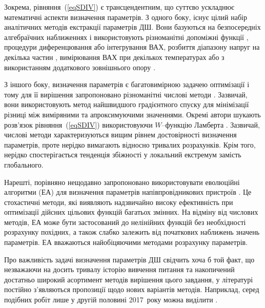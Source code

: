 Зокрема, рівняння~(\ref{eqSDIV}) є трансцендентним, що суттєво ускладнює математичні аспекти визначення параметрів.
З одного боку, існує цілий набір аналітичних методів екстракції параметрів ДШ.
Вони базуються на безпосередніх алгебраїчних наближеннях і використовують різноманітні допоміжні функції \cite{Norde,Lien,Werner,Cheung,Gromov,Lee,Bohlin,Cibils,Manifacier},
процедури  диференцювання  \cite{Mikhelashvili} або інтегрування  \cite{Kaminski,Ortiz1995,Durmus} ВАХ,
розбиття діапазону напруг на декілька частин \cite{Cataldo},
вимірювання ВАХ при декількох температурах \cite{Sato} або з використанням додаткового зовнішнього опору \cite{Lyakas}.


З іншого боку, визначення параметрів є багатовимірною задачею оптимізації і тому для її вирішення запропоновано різноманітні числові методи \cite{Ortiz1999,Evangelou,Donoval,Ferhat}.
Зазвичай, вони використовують метод найшвидшого градієнтного спуску для мінімізації різниці між виміряними та апроксимуючими значеннями.
Окремі автори\cite{Lambert_Jung,Ortiz2005} шукають розв'язок рівняння~(\ref{eqSDIV}) використовуючи $W$--функцію Ламберта
\cite{LambertBook}.
Зазвичай, числові методи характеризуються вищим рівнем достовірності визначення параметрів, проте нерідко вимагають відносно тривалих розрахунків.
Крім того, нерідко спостерігається тенденція збіжності у локальний екстремум замість глобального.

Нарешті, порівняно нещодавно запропоновано використовувати еволюційні алгоритми (ЕА) для визначення параметрів напівпровідникових пристроїв \cite{PSO_Ye,DEWang,GA_Li,P-DE_Ishaque,TLBO_Patel,MABC,PSOWang,GA_Schottky}.
Це стохастичні методи, які виявляють надзвичайно високу ефективність при оптимізації дійсних цільових функцій багатьох змінних.
На відміну від числових методів, ЕА може бути застосований до нелінійних функцій без необхідності розрахунку похідних, а також слабко залежить від початкових наближень значень параметрів.
ЕА вважаються \cite{P-DE_Ishaque} найобіцяючими  методами розрахунку параметрів.

Про важливість задачі визначення параметрів ДШ свідчить хоча б той факт, що
незважаючи на досить тривалу історію вивчення питання та накопичений достатньо широкий асортимент методів вирішення цього завдання,
у літературі постійно з'являються пропозиції щодо нових варіантів методів.
Наприклад, серед подібних робіт лише у другій половині 2017~року можна виділити \cite{Noise:Roy,MikhelashviliJAP2017,Cataldo,ORTIZCONDE2018}.

